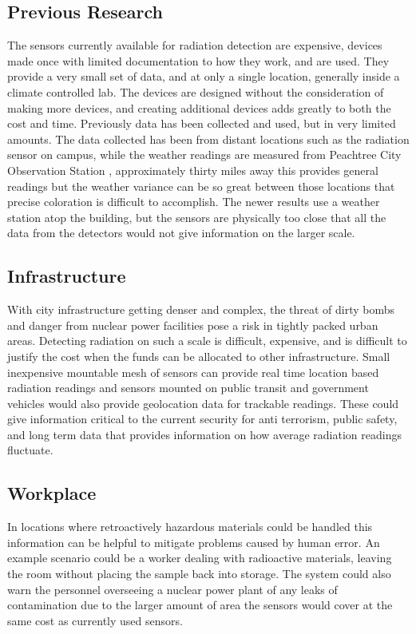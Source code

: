 \documentclass[10pt]{article}
\begin{document}
\subsection{Previous Research}
The sensors currently available for radiation detection are expensive, devices made 
once with limited documentation to how they work, and are used. They provide a very 
small set of data, and at only a single location, generally inside a climate controlled 
lab. The devices are designed without the consideration of making more devices, and 
creating additional devices adds greatly to both the cost and time. Previously data 
has been collected and used, but in very limited amounts. The data collected has been 
from distant locations such as the radiation sensor on campus, while the weather 
readings are measured from Peachtree City Observation Station \cite{Dayananda2013}, 
approximately thirty miles away this provides general readings but the weather variance 
can be so great between those locations that precise coloration is difficult to 
accomplish. The newer results use a weather station atop the building, but the sensors 
are physically too close that all the data from the detectors would not give 
information on the larger scale.

\subsection{Infrastructure}
With city infrastructure getting denser and complex, the threat of dirty bombs and 
danger from nuclear power facilities pose a risk in tightly packed urban areas. 
Detecting radiation on such a scale is difficult, expensive, and is difficult to 
justify the cost when the funds can be allocated to other infrastructure. Small 
inexpensive mountable mesh of sensors can provide real time location based
radiation readings and sensors mounted on public transit and government vehicles would also 
provide geolocation data for trackable readings. These could give information critical 
to the current security for anti terrorism, public safety, and long term data that provides information
on how average radiation readings fluctuate.

\subsection{Workplace}
In locations where retroactively hazardous materials could be handled this information can
be helpful to mitigate problems caused by human error. An example scenario could be a worker 
dealing with radioactive materials, leaving the room without placing the sample back into storage.
The system could also warn the personnel overseeing a nuclear power plant of any leaks of contamination
due to the larger amount of area the sensors would cover at the same cost as currently used sensors.
\end{document}
